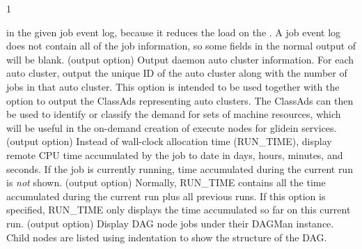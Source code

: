 \begin{ManPage}{\label{man-condor-q}}{1}
\begin{Options}
{    in the given job event log, because it reduces the load on the .
    A job event log does not contain all of the job information, so some fields in
    the normal output of  will be blank.}
   {(output option) 
    Output  daemon auto cluster information.
    For each auto cluster,
    output the unique ID of the auto cluster
    along with the number of jobs in that auto cluster. 
    This option is intended to be used together with the  option
    to output the ClassAds representing auto clusters.  
    The ClassAds can then be used to identify or classify the demand for
    sets of machine resources, 
    which will be useful in the on-demand creation of execute nodes for
    glidein services. } 
   {(output option) 
    Instead of wall-clock allocation time (RUN\_TIME), 
    display remote CPU time accumulated by the job to date in days,
    hours, minutes, and seconds.  If the job is currently running, time
    accumulated during the current run is \emph{not} shown.}
   {(output option)
    Normally, RUN\_TIME contains all the time
    accumulated during the current run plus all previous runs.  If this
    option is specified, RUN\_TIME only displays the time accumulated so
    far on this current run.}
   {(output option) Display DAG node jobs 
    under their DAGMan instance.
    Child nodes are listed using indentation to show the structure
    of the DAG.}
\end{Options}
\end{ManPage}
